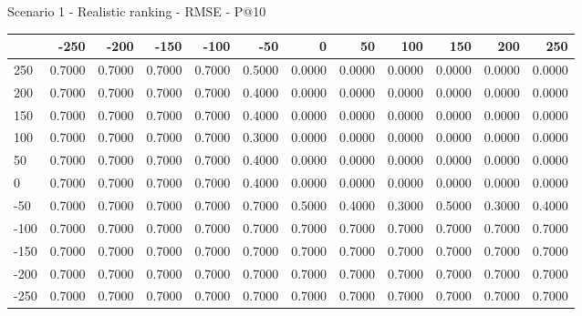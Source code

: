 Scenario 1 - Realistic ranking - RMSE - P@10
\begin{tabular}{lrrrrrrrrrrr}
\toprule
{} &   -250 &   -200 &   -150 &   -100 &   -50  &    0   &    50  &    100 &    150 &    200 &    250 \\
\midrule
 250 & 0.7000 & 0.7000 & 0.7000 & 0.7000 & 0.5000 & 0.0000 & 0.0000 & 0.0000 & 0.0000 & 0.0000 & 0.0000 \\
 200 & 0.7000 & 0.7000 & 0.7000 & 0.7000 & 0.4000 & 0.0000 & 0.0000 & 0.0000 & 0.0000 & 0.0000 & 0.0000 \\
 150 & 0.7000 & 0.7000 & 0.7000 & 0.7000 & 0.4000 & 0.0000 & 0.0000 & 0.0000 & 0.0000 & 0.0000 & 0.0000 \\
 100 & 0.7000 & 0.7000 & 0.7000 & 0.7000 & 0.3000 & 0.0000 & 0.0000 & 0.0000 & 0.0000 & 0.0000 & 0.0000 \\
 50  & 0.7000 & 0.7000 & 0.7000 & 0.7000 & 0.4000 & 0.0000 & 0.0000 & 0.0000 & 0.0000 & 0.0000 & 0.0000 \\
 0   & 0.7000 & 0.7000 & 0.7000 & 0.7000 & 0.4000 & 0.0000 & 0.0000 & 0.0000 & 0.0000 & 0.0000 & 0.0000 \\
-50  & 0.7000 & 0.7000 & 0.7000 & 0.7000 & 0.7000 & 0.5000 & 0.4000 & 0.3000 & 0.5000 & 0.3000 & 0.4000 \\
-100 & 0.7000 & 0.7000 & 0.7000 & 0.7000 & 0.7000 & 0.7000 & 0.7000 & 0.7000 & 0.7000 & 0.7000 & 0.7000 \\
-150 & 0.7000 & 0.7000 & 0.7000 & 0.7000 & 0.7000 & 0.7000 & 0.7000 & 0.7000 & 0.7000 & 0.7000 & 0.7000 \\
-200 & 0.7000 & 0.7000 & 0.7000 & 0.7000 & 0.7000 & 0.7000 & 0.7000 & 0.7000 & 0.7000 & 0.7000 & 0.7000 \\
-250 & 0.7000 & 0.7000 & 0.7000 & 0.7000 & 0.7000 & 0.7000 & 0.7000 & 0.7000 & 0.7000 & 0.7000 & 0.7000 \\
\bottomrule
\end{tabular}


